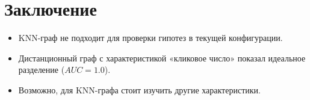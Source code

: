 \documentclass[a4paper, 12pt]{article}
\begin{document}
\section*{Заключение}
\begin{itemize}
    \item KNN-граф не подходит для проверки гипотез в текущей конфигурации.
    \item Дистанционный граф с характеристикой «кликовое число» показал идеальное разделение (\(AUC = 1.0\)).
    \item Возможно, для KNN-графа стоит изучить другие характеристики.
\end{itemize}
\end{document}

